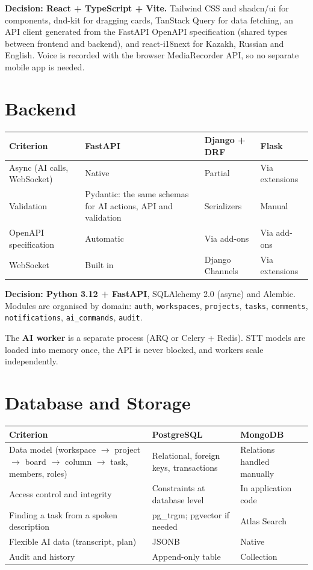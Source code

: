 \documentclass[11pt,a4paper]{article}
\newcommand{\tblstart}{\small\rowcolors{2}{gray!7}{white}}
\newcommand{\code}[1]{\texttt{#1}}
\begin{document}
\textbf{Decision: React + TypeScript + Vite.} Tailwind CSS and shadcn/ui for components, dnd-kit for dragging cards, TanStack Query for data fetching, an API client generated from the FastAPI OpenAPI specification (shared types between frontend and backend), and react-i18next for Kazakh, Russian and English. Voice is recorded with the browser MediaRecorder API, so no separate mobile app is needed.

\section{Backend}

{\tblstart
\begin{xltabular}{\textwidth}{P{3.6cm} L L L}
\toprule
\textbf{Criterion} & \textbf{FastAPI} & \textbf{Django + DRF} & \textbf{Flask} \\
\midrule
\endhead
Async (AI calls, WebSocket) & Native & Partial & Via extensions \\
Validation & Pydantic: the same schemas for AI actions, API and validation & Serializers & Manual \\
OpenAPI specification & Automatic & Via add-ons & Via add-ons \\
WebSocket & Built in & Django Channels & Via extensions \\
\bottomrule
\end{xltabular}}

\textbf{Decision: Python 3.12 + FastAPI}, SQLAlchemy 2.0 (async) and Alembic. Modules are organised by domain: \code{auth}, \code{workspaces}, \code{projects}, \code{tasks}, \code{comments}, \code{notifications}, \code{ai\_commands}, \code{audit}.

The \textbf{AI worker} is a separate process (ARQ or Celery + Redis). STT models are loaded into memory once, the API is never blocked, and workers scale independently.

\section{Database and Storage}

{\tblstart
\begin{xltabular}{\textwidth}{P{4.4cm} L L}
\toprule
\textbf{Criterion} & \textbf{PostgreSQL} & \textbf{MongoDB} \\
\midrule
\endhead
Data model (workspace $\rightarrow$ project $\rightarrow$ board $\rightarrow$ column $\rightarrow$ task, members, roles) & Relational, foreign keys, transactions & Relations handled manually \\
Access control and integrity & Constraints at database level & In application code \\
Finding a task from a spoken description & pg\_trgm; pgvector if needed & Atlas Search \\
Flexible AI data (transcript, plan) & JSONB & Native \\
Audit and history & Append-only table & Collection \\
\bottomrule
\end{xltabular}}
\end{document}
